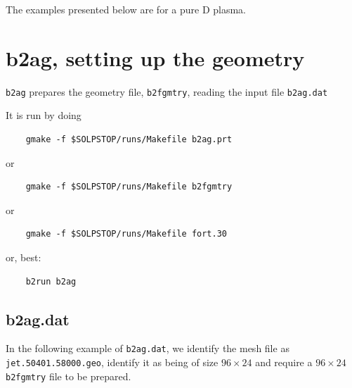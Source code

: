 \documentclass[a4paper,10pt]{report}
\begin{document}
The examples presented below are for a pure D plasma.

\newpage\section{b2ag, setting up the geometry}
\label{sec:b2ag}

{\tt b2ag} prepares the geometry file, {\tt b2fgmtry}, reading the
input file {\tt b2ag.dat}

It is run by doing
\begin{verbatim}
    gmake -f $SOLPSTOP/runs/Makefile b2ag.prt
\end{verbatim}
or
\begin{verbatim}
    gmake -f $SOLPSTOP/runs/Makefile b2fgmtry
\end{verbatim}
or
\begin{verbatim}
    gmake -f $SOLPSTOP/runs/Makefile fort.30
\end{verbatim}
or, best:
\begin{verbatim}
    b2run b2ag
\end{verbatim}

\subsection{b2ag.dat}

In the following example of {\tt b2ag.dat}, we identify the mesh file
as {\tt jet.50401.58000.geo}, identify it as being of size $96 \times
24$ and require a $96 \times 24$ {\tt b2fgmtry} file to be prepared.

\end{document}
